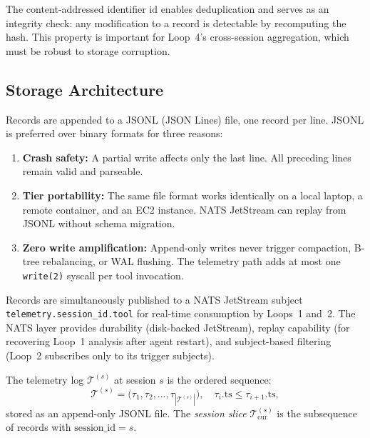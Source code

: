 \begin{remark}
The content-addressed identifier $\text{id}$ enables deduplication and serves
as an integrity check: any modification to a record is detectable by recomputing
the hash. This property is important for Loop~4's cross-session aggregation,
which must be robust to storage corruption.
\end{remark}

\subsection{Storage Architecture}

Records are appended to a JSONL (JSON Lines) file, one record per line. JSONL
is preferred over binary formats for three reasons:

\begin{enumerate}[leftmargin=1.5em]
    \item \textbf{Crash safety:} A partial write affects only the last line.
          All preceding lines remain valid and parseable.
    \item \textbf{Tier portability:} The same file format works identically
          on a local laptop, a remote container, and an EC2 instance. NATS
          JetStream can replay from JSONL without schema migration.
    \item \textbf{Zero write amplification:} Append-only writes never
          trigger compaction, B-tree rebalancing, or WAL flushing. The
          telemetry path adds at most one \texttt{write(2)} syscall per
          tool invocation.
\end{enumerate}

Records are simultaneously published to a NATS JetStream subject
\texttt{telemetry.{session\_id}.{tool}} for real-time consumption by Loops~1
and~2. The NATS layer provides durability (disk-backed JetStream), replay
capability (for recovering Loop~1 analysis after agent restart), and
subject-based filtering (Loop~2 subscribes only to its trigger subjects).

\begin{definition}
\label{def:telemetry_log}
The telemetry log $\mathcal{T}^{(s)}$ at session $s$ is the ordered sequence:
\begin{equation}
\mathcal{T}^{(s)} = \bigl( \tau_1, \tau_2, \ldots, \tau_{|\mathcal{T}^{(s)}|} \bigr),
\quad \tau_i.\text{ts} \leq \tau_{i+1}.\text{ts},
\end{equation}
stored as an append-only JSONL file. The \emph{session slice}
$\mathcal{T}^{(s)}_{\text{cur}}$ is the subsequence of records with
$\text{session\_id} = s$.
\end{definition}

